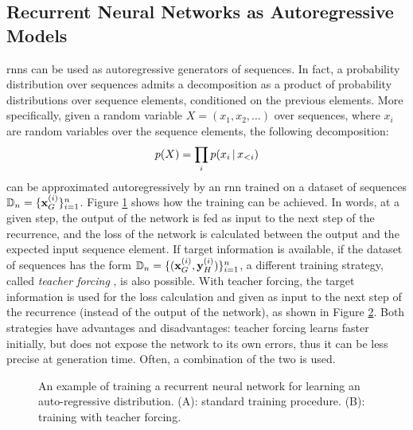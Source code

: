 \subsection{Recurrent Neural Networks as Autoregressive Models}
\glspl{rnn} can be used as autoregressive generators of sequences. In fact, a probability distribution over sequences admits a decomposition as a product of probability distributions over sequence elements, conditioned on the previous elements. More specifically, given a random variable $X = (x_1, x_2, \ldots)$ over sequences, where $x_i$ are random variables over the sequence elements, the following decomposition:
$$p(X) = \prod_i p(x_{i} \,|\, x_{<i})$$
can be approximated autoregressively by an \gls{rnn} trained on a dataset of sequences $\Data_n = \Set{\Vector{x}_G^{(i)}}_{i=1}^n$. Figure \ref{fig:auto-regressive} shows how the training can be achieved. In words, at a given step, the output of the network is fed as input to the next step of the recurrence, and the loss of the network is calculated between the output and the expected input sequence element. If target information is available, \ie if the dataset of sequences has the form $\Data_n = \Set{(\Vector{x}_G^{(i)}, \Vector{y}_H^{(i)})}_{i=1}^n$, a different training strategy, called \emph{teacher forcing} \citep{williams1989teacherforcing}, is also possible. With teacher forcing, the target information is used for the loss calculation and given as input to the next step of the recurrence (instead of the output of the network), as shown in Figure \ref{fig:teacher-forcing}. Both strategies have advantages and disadvantages: teacher forcing learns faster initially, but does not expose the network to its own errors, thus it can be less precise at generation time. Often, a combination of the two is used.
\begin{figure*}[h!]
    \begin{subfigure}[b]{0.49\linewidth}
        \centering
        \resizebox{.9\textwidth}{!}{}
        \caption{}
        \label{fig:auto-regressive}
    \end{subfigure}
    \begin{subfigure}[b]{0.49\linewidth}
        \centering
        \resizebox{.9\textwidth}{!}{}
        \caption{}
        \label{fig:teacher-forcing}
    \end{subfigure}
    \caption{An example of training a recurrent neural network for learning an auto-regressive distribution. (A): standard training procedure. (B): training with teacher forcing.}
    \label{fig:rnn-auto-regressive}
\end{figure*}
